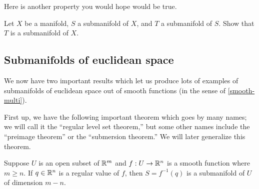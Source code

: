 Here is another property you would hope would be true. 

\begin{exercise}
	Let $X$ be a manifold, $S$ a submanifold of $X$, and $T$ a submanifold of $S$. Show that $T$ is a submanifold of $X$. 
\end{exercise}

\subsection{Submanifolds of euclidean space}

We now have two important results which let us produce lots of examples of submanifolds of euclidean space out of smooth functions (in the sense of \cref{smooth-multi}). 

First up, we have the following important theorem which goes by many names; we will call it the ``regular level set theorem,'' but some other names include the ``preimage theorem'' or the ``submersion theorem.'' We will later generalize this theorem. 

\begin{theorem} \label{regular-level-set-theorem-local}
	Suppose $U$ is an open subset of $\mathbb{R}^m$ and $f : U \to \mathbb{R}^n$ is a smooth function where $m \geq n$. If $q \in \mathbb{R}^n$ is a regular value of $f$, then $S = f^{-1}(q)$ is a submanifold of $U$ of dimension $m-n$. 
\end{theorem}

